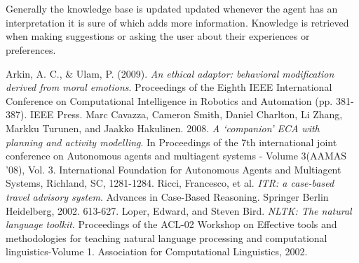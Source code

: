 \documentclass[11pt]{article} %
\begin{document}
\\
\\
Generally the knowledge base is updated updated whenever the agent has an interpretation it is sure of which adds more information. Knowledge is retrieved when making suggestions or asking the user about their experiences or preferences.

\begin{thebibliography}{9}

Arkin, A. C., \& Ulam, P. (2009). \emph{An ethical adaptor: behavioral modification derived from moral emotions}. Proceedings of the Eighth IEEE International Conference on Computational Intelligence in Robotics and Automation (pp. 381-387). IEEE Press.
Marc Cavazza, Cameron Smith, Daniel Charlton, Li Zhang, Markku Turunen, and Jaakko Hakulinen. 2008. \emph{A `companion' ECA with planning and activity modelling}. In Proceedings of the 7th international joint conference on Autonomous agents and multiagent systems - Volume 3(AAMAS '08), Vol. 3. International Foundation for Autonomous Agents and Multiagent Systems, Richland, SC, 1281-1284.
Ricci, Francesco, et al. \emph{ITR: a case-based travel advisory system}. Advances in Case-Based Reasoning. Springer Berlin Heidelberg, 2002. 613-627.
Loper, Edward, and Steven Bird. \emph{NLTK: The natural language toolkit}. Proceedings of the ACL-02 Workshop on Effective tools and methodologies for teaching natural language processing and computational linguistics-Volume 1. Association for Computational Linguistics, 2002.

\end{thebibliography}
\end{document}
